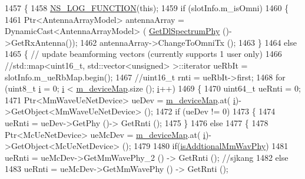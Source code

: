 \begin{DoxyCode}
1457 \{
1458 \hyperlink{log-macros-disabled_8h_a90b90d5bad1f39cb1b64923ea94c0761}{NS\_LOG\_FUNCTION}(\textcolor{keyword}{this});
1459         \textcolor{keywordflow}{if} (slotInfo.m\_isOmni)
1460         \{
1461                 Ptr<AntennaArrayModel> antennaArray = DynamicCast<AntennaArrayModel> (
      \hyperlink{classns3_1_1MmWaveEnbPhy_a1fd12ed3e1da54288cf17a1bb9bcdf74}{GetDlSpectrumPhy} ()->GetRxAntenna());
1462                 antennaArray->ChangeToOmniTx ();
1463         \}
1464         \textcolor{keywordflow}{else}
1465         \{ \textcolor{comment}{// update beamforming vectors (currently supports 1 user only)}
1466                 \textcolor{comment}{//std::map<uint16\_t, std::vector<unsigned> >::iterator ueRbIt = slotInfo.m\_ueRbMap.begin();}
1467                 \textcolor{comment}{//uint16\_t rnti = ueRbIt->first;}
1468                 \textcolor{keywordflow}{for} (uint8\_t \hyperlink{bernuolliDistribution_8m_a6f6ccfcf58b31cb6412107d9d5281426}{i} = 0; \hyperlink{bernuolliDistribution_8m_a6f6ccfcf58b31cb6412107d9d5281426}{i} < \hyperlink{classns3_1_1MmWaveEnbPhy_a4b6fe922f96dd05597a1fe2f9a523ce9}{m\_deviceMap}.size (); \hyperlink{bernuolliDistribution_8m_a6f6ccfcf58b31cb6412107d9d5281426}{i}++)
1469                 \{
1470                         uint64\_t ueRnti = 0;
1471                         Ptr<MmWaveUeNetDevice> ueDev = \hyperlink{classns3_1_1MmWaveEnbPhy_a4b6fe922f96dd05597a1fe2f9a523ce9}{m\_deviceMap}.at(
      \hyperlink{bernuolliDistribution_8m_a6f6ccfcf58b31cb6412107d9d5281426}{i})->GetObject<MmWaveUeNetDevice> ();
1472                         \textcolor{keywordflow}{if} (ueDev != 0) 
1473                         \{
1474                                 ueRnti = ueDev->GetPhy ()-> GetRnti ();
1475                         \}
1476                         \textcolor{keywordflow}{else}
1477                         \{
1478                                 Ptr<McUeNetDevice> ueMcDev = \hyperlink{classns3_1_1MmWaveEnbPhy_a4b6fe922f96dd05597a1fe2f9a523ce9}{m\_deviceMap}.at(
      \hyperlink{bernuolliDistribution_8m_a6f6ccfcf58b31cb6412107d9d5281426}{i})->GetObject<McUeNetDevice> ();
1479 
1480                                 \textcolor{keywordflow}{if}(\hyperlink{classns3_1_1MmWaveEnbPhy_a1a171ed81b1efedf963000d89f2cbd98}{isAddtionalMmWavPhy})
1481                                         ueRnti = ueMcDev->GetMmWavePhy\_2 () -> GetRnti (); \textcolor{comment}{//sjkang}
1482                                 \textcolor{keywordflow}{else}
1483                                         ueRnti = ueMcDev->GetMmWavePhy () -> GetRnti ();

\end{DoxyCode}
